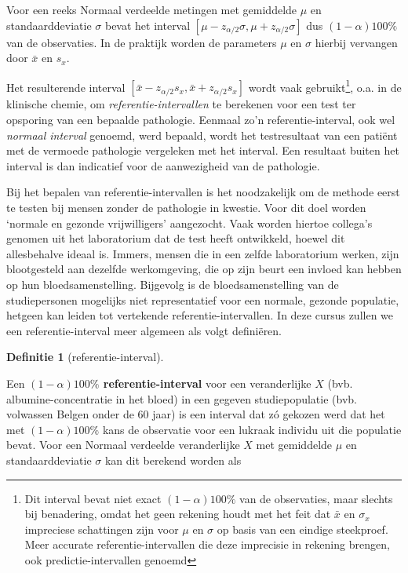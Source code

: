 \documentclass[
  12pt,dutch,coursenotes]{book}
\theoremstyle{definition}
\newtheorem{definition}{Definitie}[chapter]
\theoremstyle{definition}
\theoremstyle{definition}
\theoremstyle{definition}
\theoremstyle{remark}
\begin{document}
Voor een reeks Normaal verdeelde metingen met gemiddelde \(\mu\) en
standaarddeviatie \(\sigma\) bevat het interval \([\mu-z_{\alpha/2}\sigma,\mu+z_{\alpha/2}\sigma]\) dus \((1-\alpha)100\%\) van de observaties. In de
praktijk worden de parameters \(\mu\) en \(\sigma\) hierbij vervangen door \(\bar x\) en \(s_x\).

Het resulterende interval \([\bar x-z_{\alpha/2}s_x,\bar x+z_{\alpha/2}s_x]\)
wordt vaak gebruikt\footnote{Dit interval bevat niet exact \((1-\alpha)100\%\) van de observaties, maar slechts bij benadering, omdat het geen rekening houdt met het feit dat \(\bar x\) en \(\sigma_x\) impreciese schattingen zijn voor \(\mu\) en \(\sigma\) op basis van een eindige steekproef. Meer accurate referentie-intervallen die deze imprecisie in rekening brengen, ook predictie-intervallen genoemd}, o.a. in de klinische chemie, om \emph{referentie-intervallen} te berekenen voor een test ter opsporing van een
bepaalde pathologie. Eenmaal zo'n referentie-interval, ook wel \emph{normaal interval} genoemd, werd bepaald, wordt het testresultaat van een
patiënt met de vermoede pathologie vergeleken met het interval. Een
resultaat buiten het interval is dan indicatief voor de aanwezigheid van de
pathologie.

Bij het bepalen van referentie-intervallen is het noodzakelijk om de methode
eerst te testen bij mensen zonder de pathologie in kwestie. Voor dit doel
worden `normale en gezonde vrijwilligers' aangezocht. Vaak worden hiertoe
collega's genomen uit het laboratorium dat de test heeft ontwikkeld, hoewel
dit allesbehalve ideaal is. Immers, mensen die in een zelfde laboratorium
werken, zijn blootgesteld aan dezelfde werkomgeving, die op zijn beurt een
invloed kan hebben op hun bloedsamenstelling. Bijgevolg is de
bloedsamenstelling van de studiepersonen mogelijks niet representatief voor
een normale, gezonde populatie, hetgeen kan leiden tot vertekende
referentie-intervallen. In deze cursus zullen we een referentie-interval
meer algemeen als volgt definiëren.

\begin{definition}[referentie-interval]
\protect\hypertarget{def:unnamed-chunk-44}{}{\label{def:unnamed-chunk-44} {} }
\end{definition}
Een \textbf{\((1-\alpha)100\%\) referentie-interval}
voor een veranderlijke \(X\) (bvb. albumine-concentratie
in het bloed) in een gegeven studiepopulatie (bvb. volwassen Belgen onder de
60 jaar) is een interval dat zó gekozen werd dat het met \((1-\alpha)100\%\)
kans de observatie voor een lukraak individu uit die populatie bevat. Voor
een Normaal verdeelde veranderlijke \(X\) met gemiddelde \(\mu\) en
standaarddeviatie \(\sigma\) kan dit berekend worden als
\end{document}
